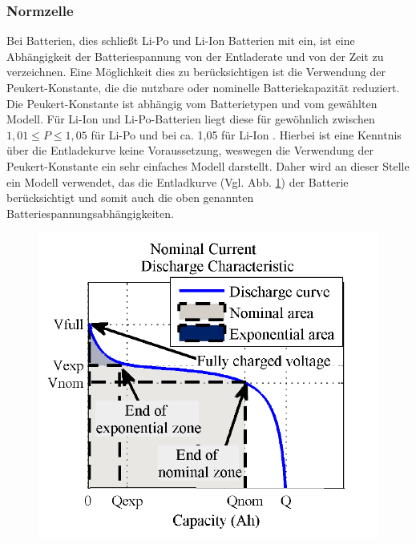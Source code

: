 \subsubsection{Normzelle}
Bei Batterien, dies schließt Li-Po und Li-Ion Batterien mit ein, ist eine Abhängigkeit der Batteriespannung von der Entladerate und von der Zeit zu verzeichnen. Eine Möglichkeit dies zu berücksichtigen ist die Verwendung der Peukert-Konstante, die die nutzbare oder nominelle Batteriekapazität reduziert. Die Peukert-Konstante ist abhängig vom Batterietypen und vom gewählten Modell. Für Li-Ion und Li-Po-Batterien liegt diese für gewöhnlich zwischen $1,01 \leq P \leq 1,05$ für Li-Po und bei ca. 1,05 für Li-Ion \cite{Traub.2016}. Hierbei ist eine Kenntnis über die Entladekurve keine Voraussetzung, weswegen die Verwendung der Peukert-Konstante ein sehr einfaches Modell darstellt. 
Daher wird an dieser Stelle ein Modell verwendet, das die Entladkurve (Vgl. Abb. \ref{abb:discharge_curve}) der Batterie berücksichtigt \cite{Tremblay.2009} und somit auch die oben genannten Batteriespannungsabhängigkeiten.  
\begin{figure}[H]
	\centering
	\includegraphics[scale=0.5]{images/Discharge.PNG}
	\label{abb:discharge_curve}
\end{figure}

